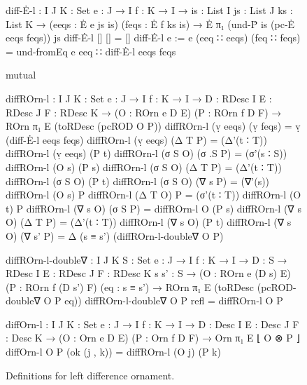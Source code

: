 \begin{figure}
\codefigure\small
\begin{code}
diff-Ė-l :  {I J K : Set} {e : J → I} {f : K → I} →
            {is : List I} {js : List J} {ks : List K} →
            (eeqs : Ė e js is) (feqs : Ė f ks is) → Ė π₁ (und-Ṗ is (pc-Ė eeqs feqs)) js
diff-Ė-l           []            []            = []
diff-Ė-l {e := e}  (eeq ∷ eeqs)  (feq ∷ feqs)  = und-fromEq e eeq ∷ diff-Ė-l eeqs feqs

mutual

  diffROrn-l :
    {I J K : Set} {e : J → I} {f : K → I} →
    {D : RDesc I} {E : RDesc J} {F : RDesc K} →
    (O : ROrn e D E) (P : ROrn f D F) → ROrn π₁ E (toRDesc (pcROD O P))
  diffROrn-l (ṿ eeqs)  (ṿ feqs)   = ṿ (diff-Ė-l eeqs feqs)
  diffROrn-l (ṿ eeqs)  (Δ T P)    = (Δ'(t ∶ T))  diffROrn-l (ṿ eeqs)  (P t)
  diffROrn-l (σ S O)   (σ .S P)   = (σ'(s ∶ S))  diffROrn-l (O s)     (P s)
  diffROrn-l (σ S O)   (Δ T P)    = (Δ'(t ∶ T))  diffROrn-l (σ S O)   (P t)
  diffROrn-l (σ S O)   (∇ s P)    = (∇'(s))      diffROrn-l (O s)     P
  diffROrn-l (Δ T O)   P          = (σ'(t ∶ T))  diffROrn-l (O t)     P
  diffROrn-l (∇ s O)   (σ S P)    =              diffROrn-l O         (P s)
  diffROrn-l (∇ s O)   (Δ T P)    = (Δ'(t ∶ T))  diffROrn-l (∇ s O)   (P t)
  diffROrn-l (∇ s O)   (∇ s' P)   = Δ (s ≡ s') (diffROrn-l-double∇ O P)

  diffROrn-l-double∇ :
    {I J K S : Set} {e : J → I} {f : K → I} →
    {D : S → RDesc I} {E : RDesc J} {F : RDesc K} {s s' : S} →
    (O : ROrn e (D s) E) (P : ROrn f (D s') F) (eq : s ≡ s') →
    ROrn π₁ E (toRDesc (pcROD-double∇ O P eq))
  diffROrn-l-double∇ O P refl = diffROrn-l O P

diffOrn-l :  {I J K : Set} {e : J → I} {f : K → I} →
             {D : Desc I} {E : Desc J} {F : Desc K} →
             (O : Orn e D E) (P : Orn f D F) → Orn π₁ E ⌊ O ⊗ P ⌋
diffOrn-l O P (ok (j , k)) = diffROrn-l (O j) (P k)
\end{code}
\caption{Definitions for left difference ornament.}
\label{fig:left-difference-ornament}
\end{figure}

